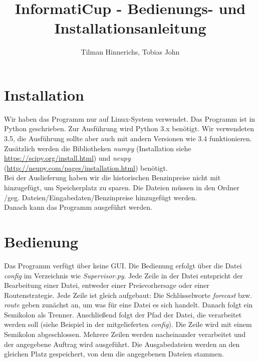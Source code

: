 \documentclass[11pt]{article}
\title{InformatiCup - Bedienungs- und Installationsanleitung}
\author{Tilman Hinnerichs, Tobias John}
\begin{document}
	
	\maketitle
	
	\section{Installation}
	Wir haben das Programm nur auf Linux-System verwendet. Das Programm ist in Python geschrieben. Zur Ausführung wird Python 3.x benötigt. Wir verwendeten 3.5, die Ausführung sollte aber auch mit andern Versionen wie 3.4 funktionieren. Zusätzlich werden die Bibliotheken \textit{numpy} (Installation siehe \url{https://scipy.org/install.html}) und \textit{neupy} (\url{http://neupy.com/pages/installation.html}) benötigt.\\
	Bei der Auslieferung haben wir die historischen Benzinpreise nicht mit hinzugefügt, um Speicherplatz zu sparen. Die Dateien müssen in den Ordner /geg. Dateien/Eingabedaten/Benzinpreise hinzugefügt werden.\\
	Danach kann das Programm ausgeführt werden.
	
	\section{Bedienung}
	Das Programm verfügt über keine GUI. Die Bedienung erfolgt über die Datei \textit{config} im Verzeichnis wie \textit{Supervisor.py}. Jede Zeile in der Datei entspricht der Bearbeitung einer Datei, entweder einer Preisvorhersage oder einer Routenstrategie. Jede Zeile ist gleich aufgebaut: Die Schlüsselworte \textit{forecast} bzw. \textit{route} geben zunächst an, um was für eine Datei es sich handelt. Danach folgt ein Semikolon als Trenner. Anschließend folgt der Pfad der Datei, die verarbeitet werden soll (siehe Beispiel in der mitgelieferten \textit{config}). Die Zeile wird mit einem Semikolon abgeschlossen. Mehrere Zeilen werden nacheinander verarbeitet und der angegebene Auftrag wird ausgeführt. Die Ausgabedateien werden an den gleichen Platz gespeichert, von dem die angegebenen Dateien stammen.
	
	

	
\end{document}

